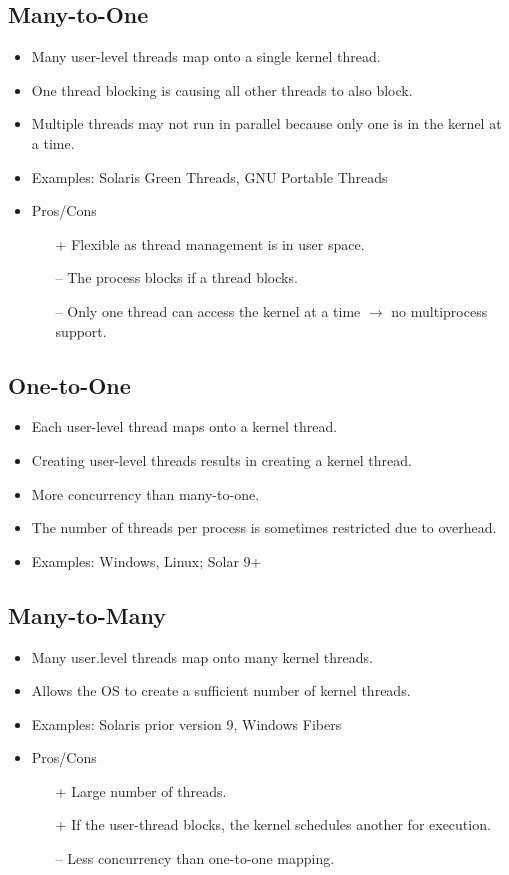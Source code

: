 		\subsection{Many-to-One}
			\begin{itemize}
				\item Many user-level threads map onto a single kernel thread.
				\item One thread blocking is causing all other threads to also block.
				\item Multiple threads may not run in parallel because only one is in the kernel at a time.
				\item Examples: Solaris Green Threads, GNU Portable Threads
				\item Pros/Cons
					\begin{itemize}
						\item[+] Flexible as thread management is in user space.
						\item[--] The process blocks if a thread blocks.
						\item[--] Only one thread can access the kernel at a time \(\rightarrow\) no multiprocess support.
					\end{itemize}
			\end{itemize}

		\subsection{One-to-One}
			\begin{itemize}
				\item Each user-level thread maps onto a kernel thread.
				\item Creating user-level threads results in creating a kernel thread.
				\item More concurrency than many-to-one.
				\item The number of threads per process is sometimes restricted due to overhead.
				\item Examples: Windows, Linux; Solar 9+
			\end{itemize}

		\subsection{Many-to-Many}
			\begin{itemize}
				\item Many user.level threads map onto many kernel threads.
				\item Allows the OS to create a sufficient number of kernel threads.
				\item Examples: Solaris prior version 9, Windows Fibers
				\item Pros/Cons
					\begin{itemize}
						\item[+] Large number of threads.
						\item[+] If the user-thread blocks, the kernel schedules another for execution.
						\item[--] Less concurrency than one-to-one mapping.
					\end{itemize}
			\end{itemize}

